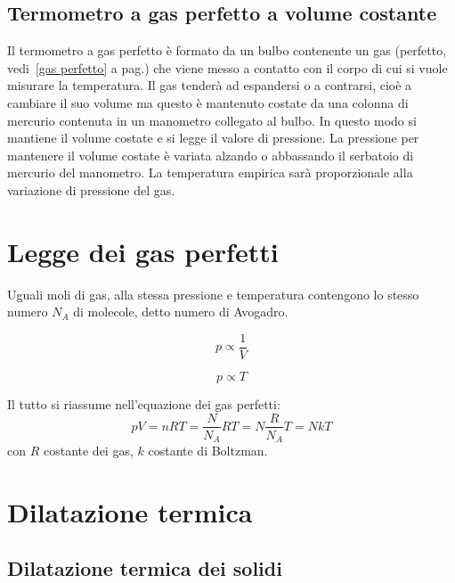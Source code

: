 \subsection{Termometro a gas perfetto a volume costante}
Il termometro a gas perfetto è formato da un bulbo contenente un gas (perfetto, vedi~\ref{gas perfetto} a pag.\@ \pageref{gas perfetto}) che viene messo a contatto con il corpo di cui si vuole misurare la temperatura. Il gas tenderà ad espandersi o a contrarsi, cioè a cambiare il suo volume ma questo è mantenuto costate da una colonna di mercurio contenuta in un manometro collegato al bulbo. In questo modo si mantiene il volume costate e si legge il valore di pressione. La pressione per mantenere il volume costate è variata alzando o abbassando il serbatoio di mercurio del manometro. La temperatura empirica sarà proporzionale alla variazione di pressione del gas.

\section{Legge dei gas perfetti}
\begin{legge}[Avogadro(1811)]
Uguali moli di gas, alla stessa pressione e temperatura contengono lo stesso numero $N_A$ di molecole, detto numero di Avogadro.
\end{legge}
\begin{legge}
\begin{equation}
p\propto\frac{1}{V}
\end{equation}
\end{legge}
\begin{legge}
\begin{equation}
p\propto{T}
\end{equation}
\end{legge}
Il tutto si riassume nell'equazione dei gas perfetti:
\begin{equation}
pV=nRT=\frac{N}{N_A}RT=N\frac{R}{N_A}T=NkT
\end{equation}
con $R$ costante dei gas, $k$ costante di Boltzman.
\section{Dilatazione termica}
\subsection{Dilatazione termica dei solidi}
